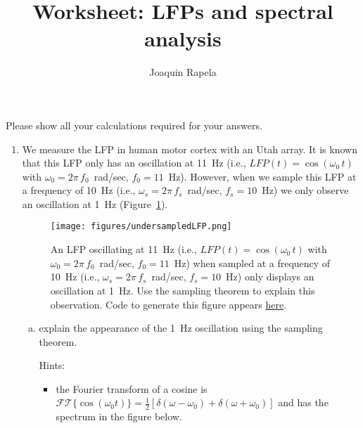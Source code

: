 \documentclass[12pt]{article}
\title{Worksheet: LFPs and spectral analysis}
\author{Joaquin Rapela}
\begin{document}
\maketitle

Please show all your calculations required for your answers.

\begin{enumerate}

    \item We measure the LFP in human motor cortex with an Utah array. It is
        known that this LFP only has an oscillation at 11~Hz (i.e.,
        $LFP(t)=\cos(\omega_0\,t)$ with $\omega_0=2\pi\,f_0$~rad/sec,
        $f_0=11$~Hz). However, when we sample this LFP at a frequency of 10~Hz
        (i.e., $\omega_s=2\pi\,f_s$~rad/sec, $f_s=10$~Hz) we only observe an
        oscillation at 1~Hz (Figure~\ref{fig:undersampledLFP}).

        \begin{figure}
            \begin{center}
                \texttt{[image: figures/undersampledLFP.png]}

                \caption{An LFP oscillating at 11~Hz (i.e., $LFP(t)=\cos(\omega_0\,t)$ with $\omega_0=2\pi\,f_0$~rad/sec,
                $f_0=11$~Hz) when sampled at a frequency of 10~Hz (i.e.,
                $\omega_s=2\pi\,f_s$~rad/sec, $f_s=10$~Hz) only displays an
                oscillation at 1~Hz. Use the sampling theorem to explain this
                observation.  Code to generate this figure appears
                \href{https://github.com/joacorapela/neuroinformatics24/blob/master/worksheets/02_LFPs_spectralAnalysis/code/doExUndersampledLFP.py}{here}.}

            \end{center}
            \label{fig:undersampledLFP}
        \end{figure}

        \begin{enumerate}[(a)]

            \item explain the appearance of the 1~Hz oscillation using the
                sampling theorem.

                Hints:

                \begin{itemize}

                    \item the Fourier transform of a cosine is
                        $\mathcal{FT}\{\cos(\omega_0 t)\}=\frac{1}{2}[\delta(\omega-\omega_0)+\delta(\omega+\omega_0)]$
                        and has the spectrum in the figure below.
                        


\end{itemize}
\end{enumerate}
\end{enumerate}
\end{document}
